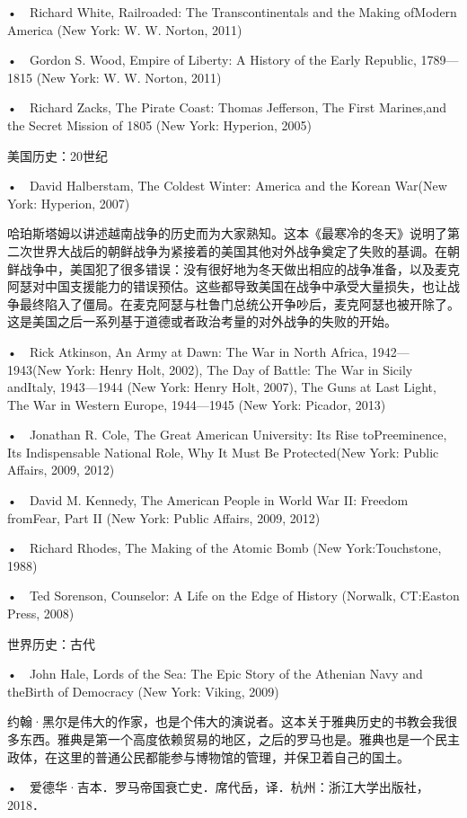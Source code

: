 •　Richard White, Railroaded: The Transcontinentals and the Making ofModern America (New York: W. W. Norton, 2011)


•　Gordon S. Wood, Empire of Liberty: A History of the Early Republic, 1789—1815 (New York: W. W. Norton, 2011)

•　Richard Zacks, The Pirate Coast: Thomas Jefferson, The First Marines,and the Secret Mission of 1805 (New York: Hyperion, 2005)



美国历史：20世纪


•　David Halberstam, The Coldest Winter: America and the Korean War(New York: Hyperion, 2007)

哈珀斯塔姆以讲述越南战争的历史而为大家熟知。这本《最寒冷的冬天》说明了第二次世界大战后的朝鲜战争为紧接着的美国其他对外战争奠定了失败的基调。在朝鲜战争中，美国犯了很多错误：没有很好地为冬天做出相应的战争准备，以及麦克阿瑟对中国支援能力的错误预估。这些都导致美国在战争中承受大量损失，也让战争最终陷入了僵局。在麦克阿瑟与杜鲁门总统公开争吵后，麦克阿瑟也被开除了。这是美国之后一系列基于道德或者政治考量的对外战争的失败的开始。

•　Rick Atkinson, 
An Army at Dawn: The War in North Africa, 1942—1943(New York: Henry Holt, 2002), 
The Day of Battle: The War in Sicily andItaly, 1943—1944 (New York: Henry Holt, 2007), 
The Guns at Last Light, The War in Western Europe, 1944—1945 (New York: Picador, 2013)


•　Jonathan R. Cole, The Great American University: Its Rise toPreeminence, Its Indispensable National Role, Why It Must Be Protected(New York: Public Affairs, 2009, 2012)

•　David M. Kennedy, The American People in World War II: Freedom fromFear, Part II (New York: Public Affairs, 2009, 2012)

•　Richard Rhodes, The Making of the Atomic Bomb (New York:Touchstone, 1988)

•　Ted Sorenson, Counselor: A Life on the Edge of History (Norwalk, CT:Easton Press, 2008)

世界历史：古代

•　John Hale, Lords of the Sea: The Epic Story of the Athenian Navy and theBirth of Democracy (New York: Viking, 2009)

约翰·黑尔是伟大的作家，也是个伟大的演说者。这本关于雅典历史的书教会我很多东西。雅典是第一个高度依赖贸易的地区，之后的罗马也是。雅典也是一个民主政体，在这里的普通公民都能参与博物馆的管理，并保卫着自己的国土。

•　爱德华·吉本．罗马帝国衰亡史．席代岳，译．杭州：浙江大学出版社，2018．

